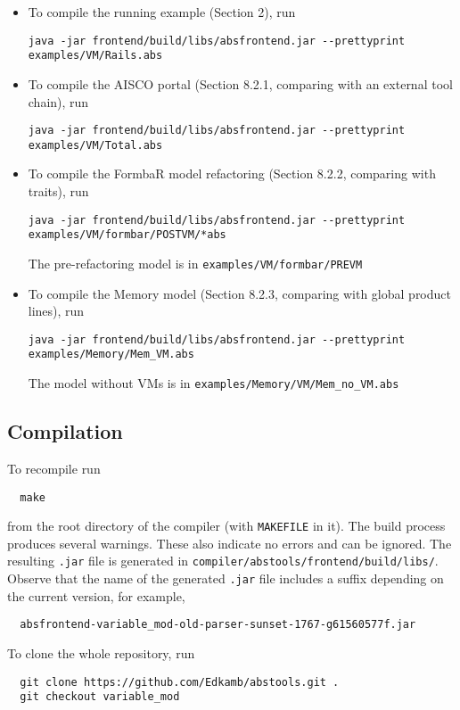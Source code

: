 \documentclass[runningheads]{llncs}
\begin{document}
\begin{itemize}
\item To compile the running example (Section 2), run

{\tt\small  java -jar frontend/build/libs/absfrontend.jar -{}-prettyprint examples/VM/Rails.abs}


\item To compile the AISCO portal (Section 8.2.1, comparing with an external tool chain), run

{\tt\small  java -jar frontend/build/libs/absfrontend.jar -{}-prettyprint examples/VM/Total.abs}




\item To compile the FormbaR model refactoring (Section 8.2.2, comparing with traits), run

{\tt\small  java -jar frontend/build/libs/absfrontend.jar -{}-prettyprint examples/VM/formbar/POSTVM/*abs}

The pre-refactoring model is in \texttt{examples/VM/formbar/PREVM}


\item To compile the Memory model (Section 8.2.3, comparing with global product lines), run

{\tt\small  java -jar frontend/build/libs/absfrontend.jar -{}-prettyprint examples/Memory/Mem\_VM.abs}


The model without VMs is in \texttt{examples/Memory/VM/Mem\_no\_VM.abs}
\end{itemize}

\subsection{Compilation}\label{sec:compile}
To recompile run 
\begin{verbatim}
  make
\end{verbatim}
from the root directory of the compiler (with \texttt{MAKEFILE} in it).
The build process produces several warnings. These also indicate no errors and can be ignored.
The resulting \texttt{.jar} file is generated in \texttt{compiler/abstools/frontend/build/libs/}. 
Observe that the name of the generated \texttt{.jar} file includes a suffix depending on the current version, for example, 
\begin{verbatim}
  absfrontend-variable_mod-old-parser-sunset-1767-g61560577f.jar
\end{verbatim}
To clone the whole repository, run 
\begin{verbatim}
  git clone https://github.com/Edkamb/abstools.git .
  git checkout variable_mod
\end{verbatim}
\end{document}
